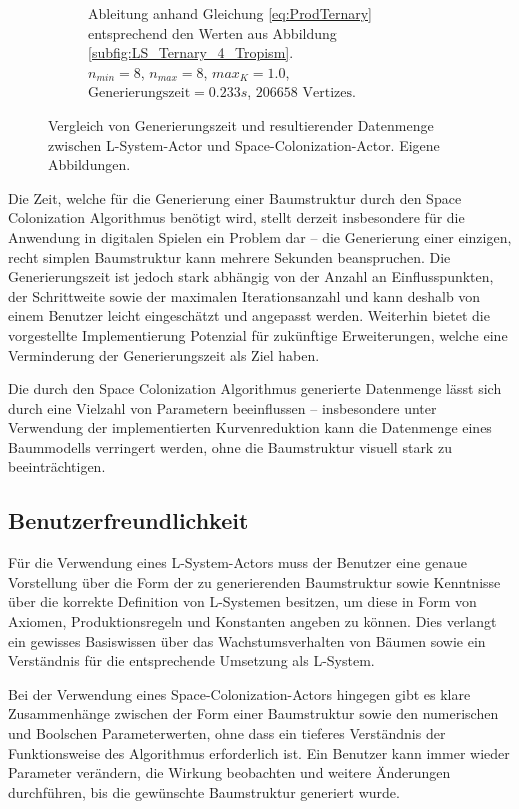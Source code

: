 \begin{figure} [hbtp]
\begin{subfigure}[t]{.45\textwidth}
		\caption{Ableitung anhand Gleichung \ref{eq:ProdTernary} entsprechend den Werten aus Abbildung \ref{subfig:LS_Ternary_4_Tropism}. \\ $n_{min} = 8$, $n_{max} = 8$, $max_K = 1.0$, \\ $\text{Generierungszeit}= 0.233s$, $206658 \text{ Vertizes}$.}
		\label{subfig:Performance_LS_Ternary_4_Tropism}
	\end{subfigure}	
	\caption{Vergleich von Generierungszeit und resultierender Datenmenge zwischen L-System-Actor und Space-Colonization-Actor. Eigene Abbildungen.}
	\label{fig:SCA_maxNG}
\end{figure}

Die Zeit, welche für die Generierung einer Baumstruktur durch den Space Colonization Algorithmus benötigt wird, stellt derzeit insbesondere für die Anwendung in digitalen Spielen ein Problem dar -- die Generierung einer einzigen, recht simplen Baumstruktur kann mehrere Sekunden beanspruchen. Die Generierungszeit ist jedoch stark abhängig von der Anzahl an Einflusspunkten, der Schrittweite sowie der maximalen Iterationsanzahl und kann deshalb von einem Benutzer leicht eingeschätzt und angepasst werden. Weiterhin bietet die vorgestellte Implementierung Potenzial für zukünftige Erweiterungen, welche eine Verminderung der Generierungszeit als Ziel haben.

Die durch den Space Colonization Algorithmus generierte Datenmenge lässt sich durch eine Vielzahl von Parametern beeinflussen -- insbesondere unter Verwendung der implementierten Kurvenreduktion kann die Datenmenge eines Baummodells verringert werden, ohne die Baumstruktur visuell stark zu beeinträchtigen.

\subsection{Benutzerfreundlichkeit}

Für die Verwendung eines L-System-Actors muss der Benutzer eine genaue Vorstellung über die Form der zu generierenden Baumstruktur sowie Kenntnisse über die korrekte Definition von L-Systemen besitzen, um diese in Form von Axiomen, Produktionsregeln und Konstanten angeben zu können. Dies verlangt ein gewisses Basiswissen über das Wachstumsverhalten von Bäumen sowie ein Verständnis für die entsprechende Umsetzung als L-System. \cite[S.86]{Deussen:05}

Bei der Verwendung eines Space-Colonization-Actors hingegen gibt es klare Zusammenhänge zwischen der Form einer Baumstruktur sowie den numerischen und Boolschen Parameterwerten, ohne dass ein tieferes Verständnis der Funktionsweise des Algorithmus erforderlich ist. Ein Benutzer kann immer wieder Parameter verändern, die Wirkung beobachten und weitere Änderungen durchführen, bis die gewünschte Baumstruktur generiert wurde. 
 \cite[S.89]{Deussen:05}
 
